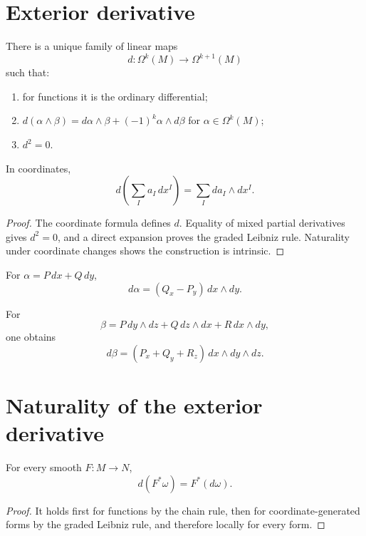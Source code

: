 \section{Exterior derivative}
\begin{theorem}\label{thm:vii09-exterior-derivative}
There is a unique family of linear maps
\[
d:\Omega^k(M)\to\Omega^{k+1}(M)
\]
such that:
\begin{enumerate}
\item for functions it is the ordinary differential;
\item \(d(\alpha\wedge\beta)=d\alpha\wedge\beta+(-1)^k\alpha\wedge d\beta\) for \(\alpha\in\Omega^k(M)\);
\item \(d^2=0\).
\end{enumerate}
In coordinates,
\[
d\!\left(\sum_I a_I\,dx^I\right)=\sum_I da_I\wedge dx^I.
\]
\end{theorem}

\begin{proof}
The coordinate formula defines \(d\). Equality of mixed partial derivatives gives \(d^2=0\), and a direct expansion proves the graded Leibniz rule. Naturality under coordinate changes shows the construction is intrinsic.
\end{proof}

\begin{example}\label{ex:vii09-d-one-form}
For \(\alpha=P\,dx+Q\,dy\),
\[
d\alpha=(Q_x-P_y)\,dx\wedge dy.
\]
\end{example}

\begin{example}\label{ex:vii09-d-two-form}
For
\[
\beta=P\,dy\wedge dz+Q\,dz\wedge dx+R\,dx\wedge dy,
\]
one obtains
\[
d\beta=(P_x+Q_y+R_z)\,dx\wedge dy\wedge dz.
\]
\end{example}

\section{Naturality of the exterior derivative}
\begin{theorem}\label{thm:vii09-natural-d}
For every smooth \(F:M\to N\),
\[
d(F^*\omega)=F^*(d\omega).
\]
\end{theorem}
\begin{proof}
It holds first for functions by the chain rule, then for coordinate-generated forms by the graded Leibniz rule, and therefore locally for every form.
\end{proof}

